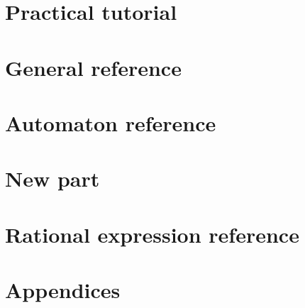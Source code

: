








\tableofcontents

\mainmatter
{}

\part{Practical tutorial}

%





\part{General reference}


\part{Automaton reference}













\part{New part}



\part{Rational expression reference}




\part{Appendices}




